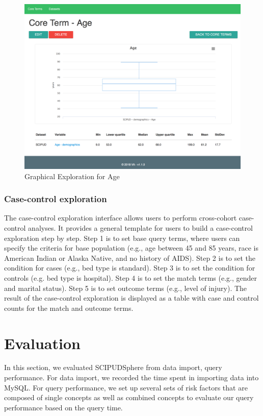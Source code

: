 \documentclass{amia}
\begin{document}
\begin{figure}[h!]
  \centering
  \includegraphics[scale=0.35]{pics/graphical.png}
  \caption{Graphical Exploration for Age}
  \label{graphical}
\end{figure}

\subsubsection{Case-control exploration}
The case-control exploration interface allows users to perform cross-cohort case-
control analyses. It provides a general template for users to build a case-control
exploration step by step. Step 1 is to set base query terms, where users can specify the criteria for base population (e.g., age between 45 and 85 years, race is American Indian or Alaska Native, and no history of AIDS). Step 2 is to set the condition for cases (e.g., bed type is standard). Step 3 is to set the condition for controls (e.g. bed type is hospital). Step 4 is to set the match terms (e.g., gender and marital status). Step 5 is to set outcome terms (e.g., level of injury). The result of the case-control exploration is displayed as a table with case and control counts for the match and outcome terms.


\section{Evaluation}
In this section, we evaluated SCIPUDSphere from data import, query performance. For data import, we recorded the time spent in importing data into MySQL. For query performance, we set up several sets of risk factors that are composed of single concepts as well as combined concepts to evaluate our query performance based on the query time.
\end{document}

